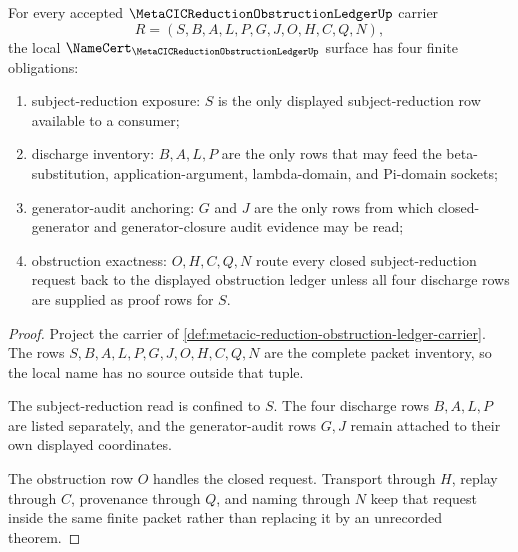 \begin{theorem}
\label{thm:metacic-reduction-obstruction-ledger-namecert-obligations}
For every accepted $\MetaCICReductionObstructionLedgerUp$ carrier
$$
R=(S,B,A,L,P,G,J,O,H,C,Q,N),
$$
the local $\NameCert_{\MetaCICReductionObstructionLedgerUp}$ surface has four finite obligations:
\begin{enumerate}
\item subject-reduction exposure: $S$ is the only displayed subject-reduction row available to a consumer;
\item discharge inventory: $B,A,L,P$ are the only rows that may feed the beta-substitution, application-argument, lambda-domain, and Pi-domain sockets;
\item generator-audit anchoring: $G$ and $J$ are the only rows from which closed-generator and generator-closure audit evidence may be read;
\item obstruction exactness: $O,H,C,Q,N$ route every closed subject-reduction request back to the displayed obstruction ledger unless all four discharge rows are supplied as proof rows for $S$.
\end{enumerate}
\end{theorem}
\begin{proof}
Project the carrier of \autoref{def:metacic-reduction-obstruction-ledger-carrier}. The rows $S,B,A,L,P,G,J,O,H,C,Q,N$ are the complete packet inventory, so the local name has no source outside that tuple.

The subject-reduction read is confined to $S$. The four discharge rows $B,A,L,P$ are listed separately, and the generator-audit rows $G,J$ remain attached to their own displayed coordinates.

The obstruction row $O$ handles the closed request. Transport through $H$, replay through $C$, provenance through $Q$, and naming through $N$ keep that request inside the same finite packet rather than replacing it by an unrecorded theorem.
\end{proof}

